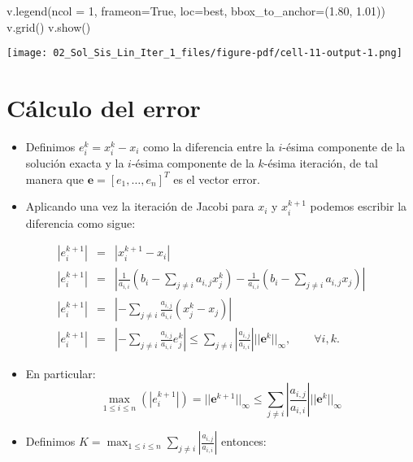 \documentclass[
  letterpaper,
  DIV=11,
  numbers=noendperiod]{scrreprt}
\newenvironment{Shaded}{\begin{snugshade}}{\end{snugshade}}
\newcommand{\DecValTok}[1]{\textcolor[rgb]{0.68,0.00,0.00}{#1}}
\newcommand{\FloatTok}[1]{\textcolor[rgb]{0.68,0.00,0.00}{#1}}
\newcommand{\NormalTok}[1]{\textcolor[rgb]{0.00,0.23,0.31}{#1}}
\newcommand{\OperatorTok}[1]{\textcolor[rgb]{0.37,0.37,0.37}{#1}}
\newcommand{\StringTok}[1]{\textcolor[rgb]{0.13,0.47,0.30}{#1}}
\newcommand{\VariableTok}[1]{\textcolor[rgb]{0.07,0.07,0.07}{#1}}
\begin{document}
\begin{Shaded}
\begin{Highlighting}[]
\NormalTok{v.legend(ncol }\OperatorTok{=} \DecValTok{1}\NormalTok{, frameon}\OperatorTok{=}\VariableTok{True}\NormalTok{, loc}\OperatorTok{=}\StringTok{\textquotesingle{}best\textquotesingle{}}\NormalTok{, bbox\_to\_anchor}\OperatorTok{=}\NormalTok{(}\FloatTok{1.80}\NormalTok{, }\FloatTok{1.01}\NormalTok{))}
\NormalTok{v.grid()}
\NormalTok{v.show()}
\end{Highlighting}
\end{Shaded}

\texttt{[image: 02\_Sol\_Sis\_Lin\_Iter\_1\_files/figure-pdf/cell-11-output-1.png]}

\section{Cálculo del error}\label{cuxe1lculo-del-error}

\begin{itemize}
\item
  Definimos \(e_i^k = x_i^k - x_i\) como la diferencia entre la
  \(i\)-ésima componente de la solución exacta y la \(i\)-ésima
  componente de la \(k\)-ésima iteración, de tal manera que
  \(\mathbf{e} = [e_1, \dots, e_n]^T\) es el vector error.
\item
  Aplicando una vez la iteración de Jacobi para \(x_i\) y \(x_i^{k+1}\)
  podemos escribir la diferencia como sigue:
\end{itemize}

\[
\begin{eqnarray*}
\left| e_i^{k+1} \right| & = &\left| x_i^{k+1} - x_i  \right| \\
\left| e_i^{k+1} \right| & = & \left|
\frac{1}{a_{i,i}} \left(b_i - \sum_{j \neq i} a_{i,j} x_j^{k} \right) -
\frac{1}{a_{i,i}} \left(b_i - \sum_{j \neq i} a_{i,j} x_j \right) \right| \\
\left| e_i^{k+1} \right| & = & \left| -\sum_{j \neq i} \frac{a_{i,j}}{a_{i,i}} (x_j^k - x_j)\right| \\
\left| e_i^{k+1} \right| & = & \left| -\sum_{j \neq i} \frac{a_{i,j}}{a_{i,i}} e_j^k \right| 
\le \sum_{j \neq i} \left| \frac{a_{i,j}}{a_{i,i}} \right| || \mathbf{e}^k ||_\infty, \qquad \forall i, k .
\end{eqnarray*}
\]

\begin{itemize}
\item
  En particular: \[
  \max_{1 \le i \le n} \left( \left| e_i^{k+1} \right| \right) =  || \mathbf{e}^{k+1} ||_\infty
   \le \sum_{j \neq i} \left| \frac{a_{i,j}}{a_{i,i}} \right| || \mathbf{e}^k ||_\infty
  \]
\item
  Definimos
  \(\displaystyle K = \max_{1 \le i \le n} \sum_{j \neq i} \left| \frac{a_{i,j}}{a_{i,i}} \right|\)
  entonces:
\end{itemize}
\end{document}
